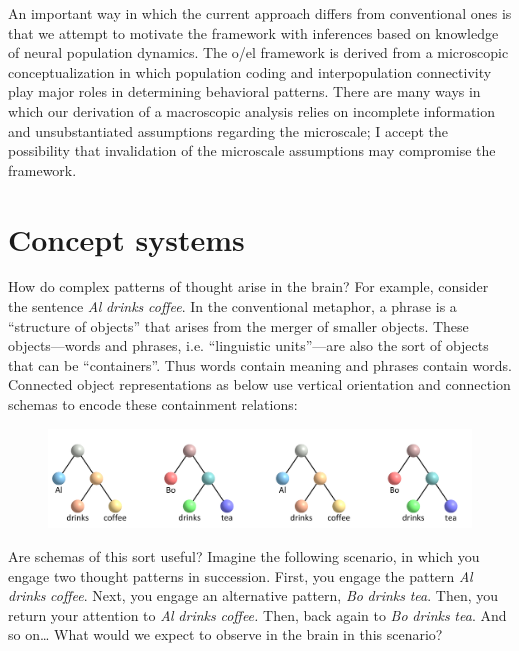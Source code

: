   An important way in which the current approach differs from conventional ones is that we attempt to motivate the framework with inferences based on knowledge of neural population dynamics. The o/el framework is derived from a microscopic conceptualization in which population coding and interpopulation connectivity play major roles in determining behavioral patterns. There are many ways in which our derivation of a macroscopic analysis relies on incomplete information and unsubstantiated assumptions regarding the microscale; I accept the possibility that invalidation of the microscale assumptions may compromise the framework.

\section{Concept systems}

How do complex patterns of thought arise in the brain? For example, consider the sentence \textit{Al} \textit{drinks} \textit{coffee}. In the conventional metaphor, a phrase is a “structure of objects” that arises from the merger of smaller objects. These objects—words and phrases, i.e. “linguistic units”—are also the sort of objects that can be “containers”. Thus words contain meaning and phrases contain words. Connected object representations as below use vertical orientation and connection schemas to encode these containment relations:

  
\begin{figure}
\includegraphics[width=\textwidth]{figures/Tilsen-img8.png}
\caption{\missingcaption}
\label{fig:}
\end{figure}
 

  Are schemas of this sort useful? Imagine the following scenario, in which you engage two thought patterns in succession. First, you engage the pattern \textit{Al} \textit{drinks} \textit{coffee}. Next, you engage an alternative pattern, \textit{Bo} \textit{drinks} \textit{tea}. Then, you return your attention to \textit{Al} \textit{drinks} \textit{coffee.} Then, back again to \textit{Bo} \textit{drinks} \textit{tea}. And so on… What would we expect to observe in the brain in this scenario? 

